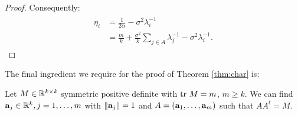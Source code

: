 \begin{proof}
  Consequently:
  \begin{align} \label{eq:etas}
    \begin{split}
      \eta_i &= \frac{1}{2\alpha} - \sigma^2 \lambda_i^{-1}\\
      &=\frac{m}{k} + \frac{\sigma^2}{k} \sum_{j\in A} \lambda_j^{-1} - \sigma^2 \lambda_i^{-1}.%
    \end{split}
  \end{align}
\end{proof}

The final ingredient we require for the proof of Theorem
\ref{thm:char} is:


\begin{lemma}\label{lemma:free}
  Let $M \in \mathbb{R}^{k \times k}$ symmetric positive definite with $\textup{tr}\ M
  = m$, $m \geq k$. We can find $\mathbf{a}_j \in \mathbb{R}^k,j=1,\dots,m$
  with $\|\mathbf{a}_j\|=1$ and $A = (\mathbf{a}_1,\dots,\mathbf{a}_m)$ such that
  $AA^t = M$.
\end{lemma}

